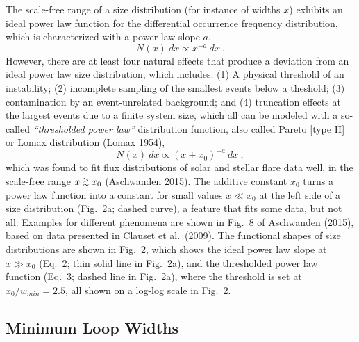 \documentclass[10pt,preprint]{aastex}  %
\def\gapprox{\lower.4ex\hbox{$\;\buildrel >\over{\scriptstyle\sim}\;$}}
\begin{document}
The scale-free range of a size distribution (for instance of widths $x$)
exhibits an ideal power law function for the differential occurrence
frequency distribution, which is characterized with a power law slope $a$, 
\begin{equation}
	 N(x) \ dx \propto x^{-a} \ dx \ .
\end{equation}  
However, there are at least four natural effects that produce a deviation 
from an ideal power law size distribution, which includes: (1) A physical 
threshold of an instability; (2) incomplete sampling of the smallest 
events below a theshold; (3) contamination by an event-unrelated 
background; and (4) truncation effects at the largest events due to a 
finite system size, which all can be modeled with a so-called 
{\sl ``thresholded power law''} distribution function, also called 
Pareto [type II] or Lomax distribution (Lomax 1954),  
\begin{equation}
	N(x)\ dx \propto (x + x_0)^{-a}\ dx \ ,
\end{equation}
which was found to fit flux distributions of solar and stellar flare 
data well, in the scale-free range $x \gapprox x_0$ (Aschwanden 2015). 
The additive constant $x_0$ turns a power law 
function into a constant for small values $x \ll x_0$ at the left side
of a size distribution (Fig.~2a; dashed curve), 
a feature that fits some data, but not all.
Examples for different phenomena are shown in Fig.~8 of Aschwanden (2015),
based on data presented in Clauset et al.~(2009).
The functional shapes of size distributions are shown in Fig.~2, 
which shows the ideal 
power law slope at $x \gg x_0$ (Eq.~2; thin solid line in Fig.~2a), and
the thresholded power law function (Eq.~3; dashed line in Fig.~2a),
where the threshold is set at $x_0/w_{min} = 2.5$, all shown on a log-log 
scale in Fig.~2.

\subsection{	Minimum Loop Widths 		 		}
\end{document}
